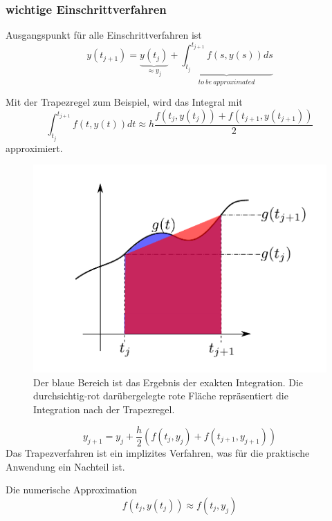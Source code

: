 \documentclass[10pt,a4paper]{article}
\begin{document}
\subsubsection{wichtige Einschrittverfahren}
Ausgangspunkt für alle Einschrittverfahren ist
\begin{equation}
y(t_{j+1})=\underbrace{y(t_j)}_{\approx y_j}+\underbrace{ \int^{t_{j+1}}_{t_j} f(s,y(s)) ds}_{to~ be~ approximated}
\end{equation}

Mit der Trapezregel zum Beispiel, wird das Integral mit
\begin{equation}
\int^{t_{j+1}}_{t_j} f(t,y(t))dt \approx h \frac{f(t_j,y(t_j))+f(t_{j+1},y(t_{j+1}))}{2}
\end{equation}
approximiert.

\begin{figure}[H]
\includegraphics[width=\textwidth]{images/trapez_approximation}
\caption{Der blaue Bereich ist das Ergebnis der exakten Integration. Die durchsichtig-rot darübergelegte rote Fläche repräsentiert die Integration nach der Trapezregel.}
\end{figure}



\begin{defi}[Trapezregel]
\begin{equation*}
y_{j+1} = y_j + \frac{h}{2} \left(f(t_j,y_j)+f(t_{j+1},y_{j+1})\right)
\end{equation*}
Das Trapezverfahren ist ein implizites Verfahren, was für die praktische Anwendung ein Nachteil ist.
\end{defi}


Die numerische Approximation 
\begin{equation}
f(t_j,y(t_j)) \approx f(t_j,y_j)
\end{equation}
\end{document}
